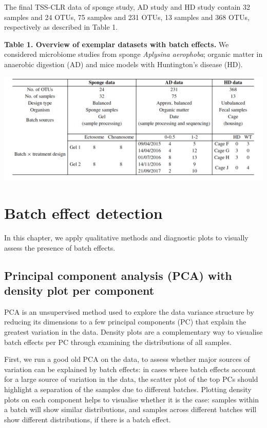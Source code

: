 \documentclass[]{book}
\begin{document}
The final TSS-CLR data of sponge study, AD study and HD study contain 32
samples and 24 OTUs, 75 samples and 231 OTUs, 13 samples and 368 OTUs,
respectively as described in Table 1.

\textbf{Table 1. Overview of exemplar datasets with batch effects.} We
considered microbiome studies from sponge \emph{Aplysina aerophoba};
organic matter in anaerobic digestion (AD) and mice models with
Huntington's disease (HD).

\begin{center}\includegraphics{figures/table} \end{center}

\chapter{Batch effect detection}\label{detect}

In this chapter, we apply qualitative methods and diagnostic plots to
visually assess the presence of batch effects.

\section{Principal component analysis (PCA) with density plot per
component}\label{principal-component-analysis-pca-with-density-plot-per-component}

PCA is an unsupervised method used to explore the data variance
structure by reducing its dimensions to a few principal components (PC)
that explain the greatest variation in the data. Density plots are a
complementary way to visualise batch effects per PC through examining
the distributions of all samples.

First, we run a good old PCA on the data, to assess whether major
sources of variation can be explained by batch effects: in cases where
batch effects account for a large source of variation in the data, the
scatter plot of the top PCs should highlight a separation of the samples
due to different batches. Plotting density plots on each component helps
to visualise whether it is the case: samples within a batch will show
similar distributions, and samples across different batches will show
different distributions, if there is a batch effect.
\end{document}
